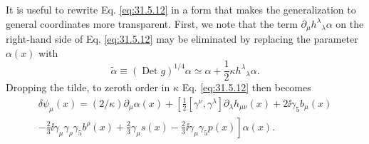 It is useful to rewrite Eq. \eqref{eq:31.5.12} in a form that makes the
generalization to general coordinates more transparent. First, we note
that the term \(\partial_\mu h^\lambda{}_\lambda\alpha\) on the
right-hand side of Eq. \eqref{eq:31.5.12} may be eliminated by replacing
the parameter \(\alpha(x)\) with
\begin{equation}
  \widetilde\alpha
  \equiv(\operatorname{Det}g)^{1/4}\alpha
  \simeq\alpha+\frac{1}{2}\kappa h^\lambda{}_\lambda\alpha.
  \tag{31.5.13}\label{eq:31.5.13}
\end{equation}
Dropping the tilde, to zeroth order in \(\kappa\) Eq. \eqref{eq:31.5.12}
then becomes
\begin{multline}
  \delta\psi_\mu(x)
  =(2/\kappa)\partial_\mu\alpha(x)
  +\left[
      \frac{1}{2}[\gamma^\nu,\gamma^\lambda]
        \partial_\lambda h_{\mu\nu}(x)
      +2\ii\gamma_5b_\mu(x)\right.\\
  \left.
      -\frac{2}{3}\ii\gamma_\mu\gamma_\rho\gamma_5b^\rho(x)
      +\frac{2}{3}\gamma_\mu s(x)
      -\frac{2}{3}\ii\gamma_\mu\gamma_5p(x)
    \right]\alpha(x).
  \tag{31.5.14}\label{eq:31.5.14}
\end{multline}


